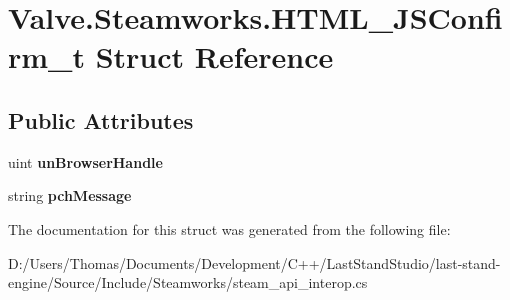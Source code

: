 \hypertarget{structValve_1_1Steamworks_1_1HTML__JSConfirm__t}{}\section{Valve.\+Steamworks.\+H\+T\+M\+L\+\_\+\+J\+S\+Confirm\+\_\+t Struct Reference}
\label{structValve_1_1Steamworks_1_1HTML__JSConfirm__t}
\subsection*{Public Attributes}
\begin{DoxyCompactItemize}
\item 
\hypertarget{structValve_1_1Steamworks_1_1HTML__JSConfirm__t_a75f8f1ce33390668a41dbbb4f34a9f4d}{}uint {\bfseries un\+Browser\+Handle}\label{structValve_1_1Steamworks_1_1HTML__JSConfirm__t_a75f8f1ce33390668a41dbbb4f34a9f4d}

\item 
\hypertarget{structValve_1_1Steamworks_1_1HTML__JSConfirm__t_a3b07f6e1576f6ca7b738c6721b9b6891}{}string {\bfseries pch\+Message}\label{structValve_1_1Steamworks_1_1HTML__JSConfirm__t_a3b07f6e1576f6ca7b738c6721b9b6891}

\end{DoxyCompactItemize}


The documentation for this struct was generated from the following file\+:\begin{DoxyCompactItemize}
\item 
D\+:/\+Users/\+Thomas/\+Documents/\+Development/\+C++/\+Last\+Stand\+Studio/last-\/stand-\/engine/\+Source/\+Include/\+Steamworks/steam\+\_\+api\+\_\+interop.\+cs\end{DoxyCompactItemize}
